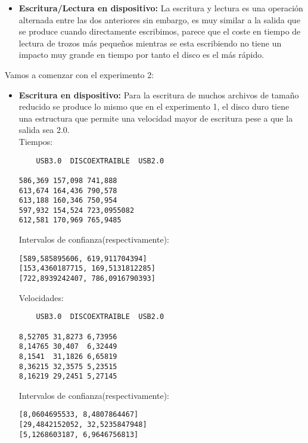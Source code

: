 \documentclass[a4paper, 10pt]{article} %
\begin{document}
\begin{itemize}
\begin{itemize}
\begin{itemize}
\begin{verbatim}
	\end{verbatim}
	Intervalos de confianza(respectivamente): 
	\begin{verbatim}
[49,7124678733, 54,0512521267]
[20,9942087077, 23,5853912923]
[14,2457254748, 15,2690745252]
	\end{verbatim}
	\begin{figure}[H]
	\centering 
	\texttt{[image: e1l]} 
	\caption{Gráfica de Tiempo de lectura.} 
	\label{contexto:figura} 
	\end{figure}
	\begin{figure}[H]
	\centering 
	\texttt{[image: e1vl]} 
	\caption{Gráfica de Velocidad de lectura.} 
	\label{contexto:figura} 
	\end{figure}
	\item \textbf{Escritura/Lectura en dispositivo:} La escritura y lectura es una operación alternada entre las dos anteriores sin embargo, es muy similar a la salida que se produce cuando directamente escribimos, parece que el coste en tiempo de lectura de trozos más pequeños mientras se esta escribiendo no tiene un impacto muy grande en tiempo por tanto el disco es el más rápido. 
\end{itemize}

Vamos a comenzar con el experimento 2:
\begin{itemize}
	\item \textbf{Escritura en dispositivo:}
	Para la escritura de muchos archivos de tamaño reducido se produce lo mismo que en el experimento 1, el disco duro tiene una estructura que permite una velocidad mayor de escritura pese a que la salida sea 2.0.\\
	Tiempos:
	\begin{verbatim}
	USB3.0	DISCOEXTRAIBLE	USB2.0
	
586,369	157,098	741,888
613,674	164,436	790,578
613,188	160,346	750,954
597,932	154,524	723,0955082
612,581	170,969	765,9485
	\end{verbatim}
	Intervalos de confianza(respectivamente): 
	\begin{verbatim}
[589,585895606, 619,911704394]
[153,4360187715, 169,5131812285]
[722,8939242407, 786,0916790393]

	\end{verbatim}
	Velocidades:
	\begin{verbatim}
	USB3.0	DISCOEXTRAIBLE	USB2.0
	
8,52705	31,8273	6,73956
8,14765	30,407	6,32449
8,1541	31,1826	6,65819
8,36215	32,3575	5,23515
8,16219	29,2451	5,27145
	\end{verbatim}
	Intervalos de confianza(respectivamente): 
	\begin{verbatim}
[8,0604695533, 8,4807864467]
[29,4842152052, 32,5235847948]
[5,1268603187, 6,9646756813]


\end{verbatim}
\end{itemize}
\end{itemize}
\end{itemize}
\end{document}
